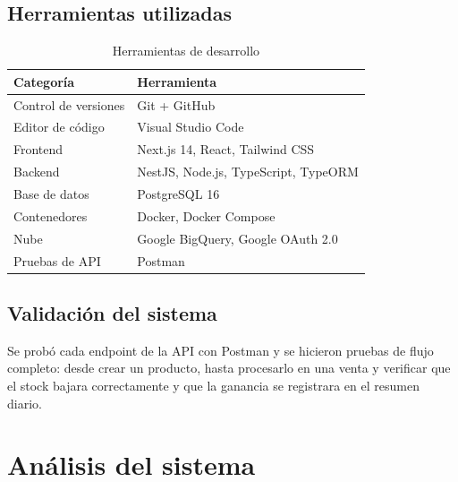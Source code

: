 \documentclass[12pt, a4paper]{article}
\begin{document}
\subsection{Herramientas utilizadas}
\begin{table}[H]
\centering
\caption{Herramientas de desarrollo}
\label{tab:herramientas}
\begin{tabular}{@{}ll@{}}
\toprule
\textbf{Categoría} & \textbf{Herramienta} \\ \midrule
Control de versiones & Git + GitHub \\
Editor de código & Visual Studio Code \\
Frontend & Next.js 14, React, Tailwind CSS \\
Backend & NestJS, Node.js, TypeScript, TypeORM \\
Base de datos & PostgreSQL 16 \\
Contenedores & Docker, Docker Compose \\
Nube & Google BigQuery, Google OAuth 2.0 \\
Pruebas de API & Postman \\ \bottomrule
\end{tabular}
\end{table}

\subsection{Validación del sistema}
Se probó cada endpoint de la API con Postman y se hicieron pruebas de flujo completo: desde crear un producto, hasta procesarlo en una venta y verificar que el stock bajara correctamente y que la ganancia se registrara en el resumen diario.

\section{Análisis del sistema}
\end{document}

